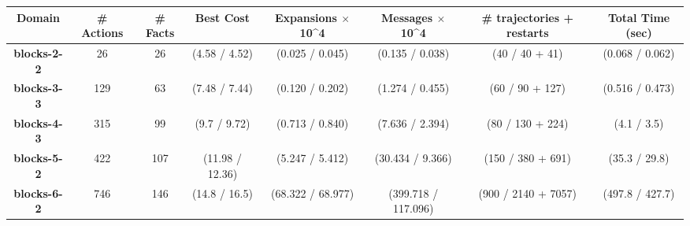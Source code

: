 \documentclass[letterpaper]{article} %
\theoremstyle{remark}
\begin{document}
\begin{table*}[]
\centering
\scriptsize
\begin{tabular}{|c|c|c||c|c|c|c|c|}
\hline
\textbf{Domain}        & \textbf{\# Actions} & \textbf{\# Facts} & \textbf{Best Cost} & \textbf{Expansions $\times$ 10\textasciicircum{}4} & \textbf{Messages $\times$ 10\textasciicircum{}4} & \textbf{\# trajectories + restarts} & \textbf{Total Time (sec)} \\ \hline\hline
\textbf{blocks-2-2}    & 26                  & 26                & (4.58 / 4.52)      & (0.025 / 0.045)                             & (0.135 / 0.038)                           & (40 / 40 + 41)                & (0.068 / 0.062)           \\ \hline
\textbf{blocks-3-3}    & 129                 & 63                & (7.48 / 7.44)      & (0.120 / 0.202)                             & (1.274 / 0.455)                           & (60 / 90 + 127)                & (0.516 / 0.473)           \\ \hline
\textbf{blocks-4-3}    & 315                 & 99                & (9.7 / 9.72)       & (0.713 / 0.840)                             & (7.636 / 2.394)                           & (80 / 130 + 224)               & (4.1 / 3.5)               \\ \hline
\textbf{blocks-5-2}    & 422                 & 107               & (11.98 / 12.36)    & (5.247 / 5.412)                             & (30.434 / 9.366)                          & (150 / 380 + 691)              & (35.3 / 29.8)             \\ \hline
\textbf{blocks-6-2}    & 746                 & 146               & (14.8 / 16.5)      & (68.322 / 68.977)                           & (399.718 / 117.096)                       & (900 / 2140 + 7057)             & (497.8 / 427.7)           \\ \hline\hline

\end{tabular}
\end{table*}
\end{document}
